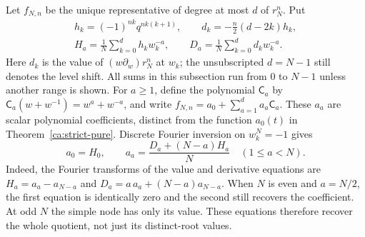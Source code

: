 Let $f_{N,n}$ be the unique representative of degree at most $d$ of $r_N^n$.
Put
\[
\begin{gathered}
 h_k=(-1)^{nk}q^{nk(k+1)},\qquad
 d_k=-\frac n2(d-2k)h_k,\\
 H_a=\frac1N\sum_{k=0}^d h_kw_k^{-a},\qquad
 D_a=\frac1N\sum_{k=0}^d d_kw_k^{-a}.
\end{gathered}
\]
Here $d_k$ is the value of $(w\partial_w)r_N^n$ at $w_k$; the
unsubscripted $d=N-1$ still denotes the level shift. All sums in this
subsection run from $0$ to $N-1$ unless another range is shown.
For $a\ge1$, define the polynomial $\mathsf C_a$ by
$\mathsf C_a(w+w^{-1})=w^a+w^{-a}$, and write
$f_{N,n}=a_0+\sum_{a=1}^d a_a\mathsf C_a$.
These $a_a$ are scalar polynomial coefficients, distinct from the
function $a_0(t)$ in Theorem~\ref{ca:strict-pure}. Discrete Fourier inversion on $w_k^N=-1$ gives
\begin{equation}\label{ca:Hermite-inverse}
 a_0=H_0,\qquad
 a_a=\frac{D_a+(N-a)H_a}{N}\quad(1\le a<N).
\end{equation}
Indeed, the Fourier transforms of the value and derivative equations
are
$H_a=a_a-a_{N-a}$ and
$D_a=a\,a_a+(N-a)a_{N-a}$. When $N$ is even and $a=N/2$, the first equation is identically zero and the second still recovers the coefficient. At odd $N$ the simple node has only its value. These equations therefore recover the whole quotient, not just its distinct-root values.

